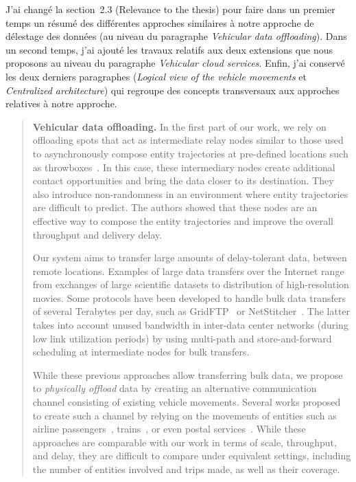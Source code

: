 \documentclass[11pt]{article}
\begin{document}
J'ai changé la section~2.3 (Relevance to the thesis) pour faire dans un premier temps un résumé des différentes approches similaires à notre approche de délestage des données (au niveau du paragraphe 
\textit{Vehicular data offloading}). Dans un second temps, j'ai ajouté les travaux relatifs aux deux extensions que nous proposons au niveau du paragraphe \textit{Vehicular cloud services}. Enfin, j'ai conservé les deux derniers paragraphes (\textit{Logical view of the vehicle movements} et \textit{Centralized architecture}) qui regroupe des concepts transversaux aux approches relatives à notre approche.

\begin{quote}
\noindent\textbf{Vehicular data offloading.} 
In the first part of our work, we rely on offloading spots that act as intermediate relay nodes similar to those used to asynchronously compose entity trajectories at pre-defined locations such as throwboxes~\cite{zhao2006capacity}. In this case, these intermediary nodes create additional contact opportunities and bring the data closer to its destination. They also introduce non-randomness in an environment where entity trajectories are difficult to predict. The authors showed that these nodes are an effective way to compose the entity trajectories and improve the overall throughput and delivery delay.

Our system aims to transfer large amounts of delay-tolerant data, between remote locations. Examples of large data transfers over the Internet range from exchanges of large scientific datasets to distribution of high-resolution movies. Some protocols have been developed to handle bulk data transfers of several Terabytes per day, such as GridFTP~\cite{allcock2003gridftp} or NetStitcher~\cite{laoutaris2011inter}. The latter takes into account unused bandwidth in inter-data center networks (during low link utilization periods) by using multi-path and store-and-forward scheduling at intermediate nodes for bulk transfers.

While these previous approaches allow transferring bulk data, we propose to \textit{physically offload} data by creating an alternative communication channel consisting of existing vehicle movements. Several works proposed to create such a channel by relying on the movements of entities such as airline passengers~\cite{keranen2009dtn}, trains~\cite{zarafshan2010trainnet}, or even postal services~\cite{wang2004turning,cho2011budget,laoutaris2013delay}. While these approaches are comparable with our work in terms of scale, throughput, and delay, they are difficult to compare under equivalent settings, including the number of entities involved and trips made, as well as their coverage.


\end{quote}
\end{document}
